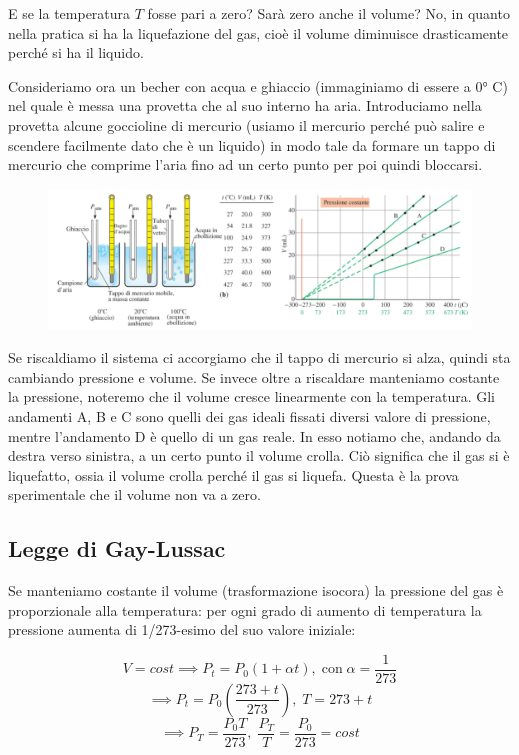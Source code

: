 E se la temperatura $T$ fosse pari a zero? Sarà zero anche il volume? No, in quanto nella pratica si ha la liquefazione del gas, cioè il volume diminuisce drasticamente perché si ha il liquido.

\vspace{0.2cm}Consideriamo ora un becher con acqua e ghiaccio (immaginiamo di essere a 0° C) nel quale è messa una provetta che al suo interno ha aria. Introduciamo nella provetta alcune goccioline di mercurio (usiamo il mercurio perché può salire e scendere facilmente dato che è un liquido) in modo tale da formare un tappo di mercurio che comprime l'aria fino ad un certo punto per poi quindi bloccarsi.

\begin{figure}[htp]
    \centering
    \includegraphics[width=15cm]{immagini/esperimento_provetta.png}
\end{figure}

Se riscaldiamo il sistema ci accorgiamo che il tappo di mercurio si alza, quindi sta cambiando pressione e volume. Se invece oltre a riscaldare manteniamo costante la pressione, noteremo che il volume cresce linearmente con la temperatura. Gli andamenti A, B e C sono quelli dei gas ideali fissati diversi valore di pressione, mentre l'andamento D è quello di un gas reale. In esso notiamo che, andando da destra verso sinistra, a un certo punto il volume crolla. Ciò significa che il gas si è liquefatto, ossia il volume crolla perché il gas si liquefa. Questa è la prova sperimentale che il volume non va a zero.
\subsection{Legge di Gay-Lussac}
Se manteniamo costante il volume (trasformazione isocora) la pressione del gas è proporzionale alla temperatura: per ogni grado di aumento di temperatura la pressione aumenta di 1/273-esimo del suo valore iniziale:

$$V=cost \implies P_t=P_0(1 + \alpha t), \; \text{con} \; \alpha=\frac{1}{273}$$
$$\implies P_t=P_0 \left( \frac{273 + t}{273} \right), \; T=273 + t$$
$$\implies P_T = \frac{P_0 T}{273}, \; \frac{P_T}{T}=\frac{P_0}{273}=cost$$

